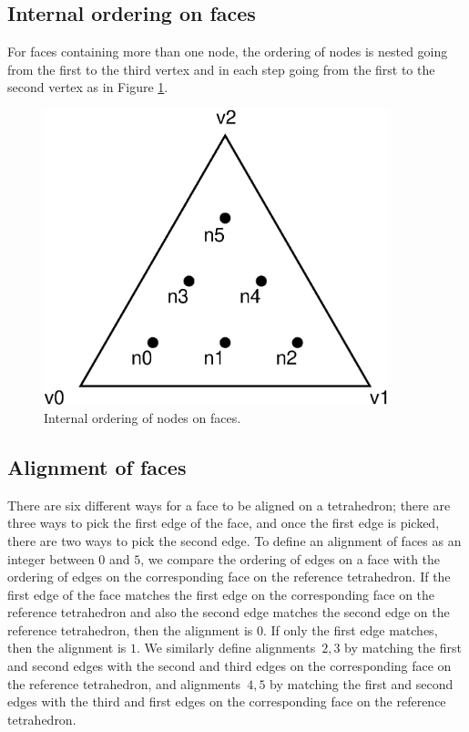 \subsection{Internal ordering on faces}

For faces containing more than one node, the ordering of nodes is
nested going from the first to the third vertex and in each step going
from the first to the second vertex as in Figure \ref{fig:ordering,faces}.

\begin{figure}[htbp]
  \begin{center}
    \includegraphics[width=10cm]{eps/face_ordering.eps}
    \caption{Internal ordering of nodes on faces.}
    \label{fig:ordering,faces}
  \end{center}
\end{figure}

\subsection{Alignment of faces}

There are six different ways for a face to be aligned on a
tetrahedron; there are three ways to pick the first edge of the face,
and once the first edge is picked, there are two ways to pick the
second edge. To define an alignment of faces as an integer between $0$
and $5$, we compare the ordering of edges on a face with the ordering
of edges on the corresponding face on the reference tetrahedron. If
the first edge of the face matches the first edge on the corresponding
face on the reference tetrahedron and also the second edge matches the
second edge on the reference tetrahedron, then the alignment is
$0$. If only the first edge matches, then the alignment is $1$. We
similarly define alignments~$2,3$ by matching the first and second
edges with the second and third edges on the corresponding face on the
reference tetrahedron, and alignments~$4,5$ by matching the first and
second edges with the third and first edges on the corresponding face
on the reference tetrahedron.

